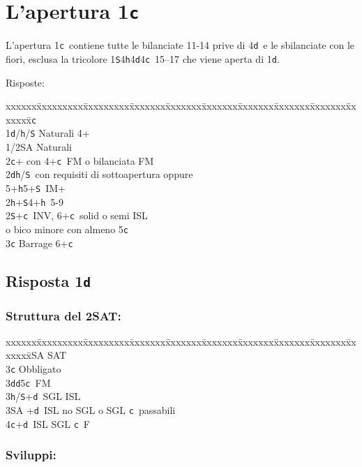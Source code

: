 \documentclass[a4paper,italian]{article}
\newcommand{\BS}{\small{\texttt{S}}}
\newcommand{\BC}{\small{\texttt{c}}}
\newcommand{\BD}{\small{\texttt{d}}}
\newcommand{\BH}{\small{\texttt{h}}}
\newcommand{\pdfc}{\texorpdfstring{\texttt{c}}{C}}
\newcommand{\pdfd}{\texorpdfstring{\texttt{d}}{D}}
\newenvironment{bidtable}
{\begin{tabbing}

    xxxxxx\=xxxxxxxxx\=xxxxxxxxx\=xxxxxxx\=xxxxxxx\=xxxxxxx\=xxxxxxx\=xxxxxxx\=xxxxxxx\=xxxxxxx\=\kill}
{\end{tabbing} }%
\begin{document}
\section{L'apertura 1\pdfc}

\begin{multicols}{2}
    L'apertura 1\BC\ contiene tutte le bilanciate 11-14 prive di 4\BD\ e le sbilanciate con le fiori, esclusa la tricolore 1\BS 4\BH 4\BD 4\BC\ 15--17
    che viene aperta di 1\BD .

    Risposte:
    \begin{bidtable}
        1\BC\+\\
        1\BD/\BH/\BS \>\hspace{5pt} Naturali 4+\\
        1/2\small{SA} \> Naturali\\
        2\BC {}+ con 4+\BC\ FM o bilanciata FM\\
        2\BD {}\BH /\BS\ con requisiti di sottoapertura oppure\+\\ 5+\BH 5+\BS\ IM+\-\\
        2\BH {}+\BS 4+\BH\ 5-9\\
        2\BS {}+\BC\ INV, 6+\BC\ solid o semi ISL \+\\ o bico minore con almeno 5\BC\-\\
        3\BC \> Barrage 6+\BC \-
    \end{bidtable}

    \subsection{Risposta 1\pdfd}

    \subsubsection{Struttura del 2\small{SA}T:}

    \begin{bidtable}
        2\small{SA} \small{SA}T\+\\
        3\BC \> Obbligato\+\\
        3\BD {}\BD 5\BC\ FM\\
        3\BH/\BS {}+\BD\ SGL ISL\\
        3\small{SA} +\BD\ ISL no SGL o SGL \BC\ passabili\\
        4\BC {}+\BD\ ISL SGL \BC\ F\-\-
    \end{bidtable}

    \subsubsection{Sviluppi:}


\end{multicols}
\end{document}
